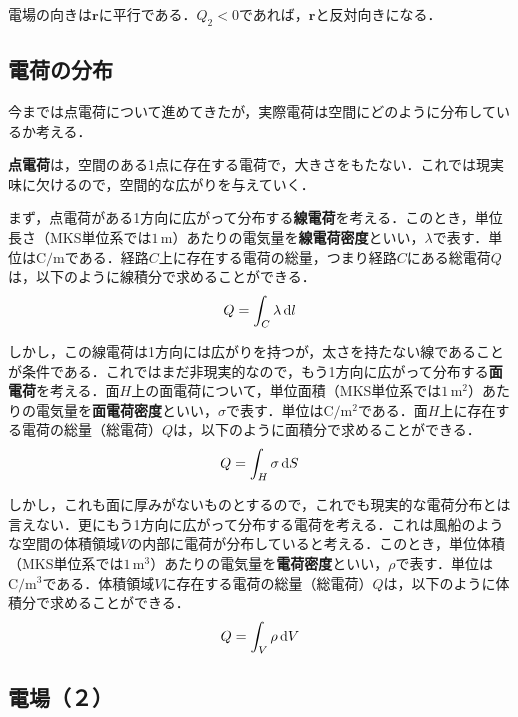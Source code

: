 電場の向きは$\bm{r}$に平行である．$Q_2 < 0$であれば，$\bm{r}$と反対向きになる．



\subsection{電荷の分布}

今までは点電荷について進めてきたが，実際電荷は空間にどのように分布しているか考える．

\textbf{点電荷}は，空間のある1点に存在する電荷で，大きさをもたない．これでは現実味に欠けるので，空間的な広がりを与えていく．

まず，点電荷がある1方向に広がって分布する\textbf{線電荷}を考える．このとき，単位長さ（MKS単位系では$1\,\mathrm{m}$）あたりの電気量を\textbf{線電荷密度}といい，$\lambda$で表す．単位は$\mathrm{C / m}$である．経路$C$上に存在する電荷の総量，つまり経路$C$にある総電荷$Q$は，以下のように線積分で求めることができる．
\begin{equation}
	Q = \int_{C} \lambda\,\mathrm{d} l
\end{equation}

しかし，この線電荷は1方向には広がりを持つが，太さを持たない線であることが条件である．これではまだ非現実的なので，もう1方向に広がって分布する\textbf{面電荷}を考える．面$H$上の面電荷について，単位面積（MKS単位系では$1\,\mathrm{m^2}$）あたりの電気量を\textbf{面電荷密度}といい，$\sigma$で表す．単位は$\mathrm{C / m^2}$である．面$H$上に存在する電荷の総量（総電荷）$Q$は，以下のように面積分で求めることができる．
\begin{equation}
	Q = \int_{H} \sigma\,\mathrm{d} S
\end{equation}

しかし，これも面に厚みがないものとするので，これでも現実的な電荷分布とは言えない．更にもう1方向に広がって分布する電荷を考える．これは風船のような空間の体積領域$V$の内部に電荷が分布していると考える．このとき，単位体積（MKS単位系では$1\,\mathrm{m^3}$）あたりの電気量を\textbf{電荷密度}といい，$\rho$で表す．単位は$\mathrm{C / m^3}$である．体積領域$V$に存在する電荷の総量（総電荷）$Q$は，以下のように体積分で求めることができる．
\begin{equation}
	Q = \int_{V} \rho\,\mathrm{d} V \label{equ:DJ1-4}
\end{equation}



\subsection{電場（２）}

